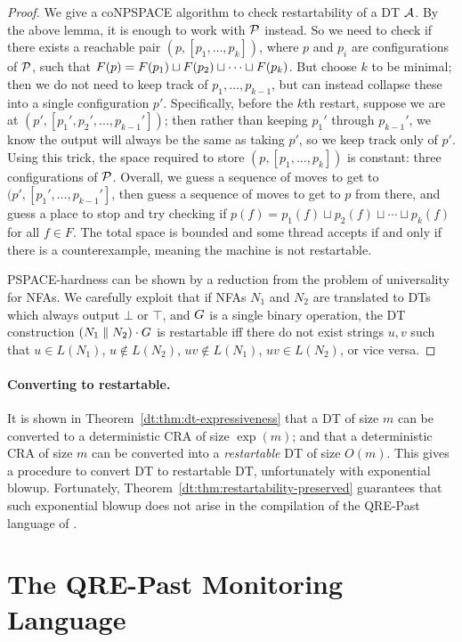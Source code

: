\begin{proof}
We give a coNPSPACE algorithm to check restartability of a DT $\mathcal{A}$. By the above lemma, it is enough to work with $\mathcal{P}$ instead.
So we need to check if there exists
a reachable pair $(p, [p_1,\ldots,p_k])$,
where $p$ and $p_i$ are configurations of $\mathcal{P}$,
such that
$F(p) = F(p_1) \sqcup F(p_2) \sqcup \cdots \sqcup F(p_k)$.
But choose $k$ to be minimal;
then we do not need to keep track of $p_1, \ldots, p_{k-1}$,
but can instead collapse these into a single configuration $p'$.
Specifically, before the $k$th restart,
suppose we are at $(p', [p_1',p_2',\ldots, p_{k-1}'])$;
then rather than keeping $p_1'$ through $p_{k-1}'$,
we know the output will always be the same as taking $p'$,
so we keep track only of $p'$.
Using this trick, the space required to store
$(p, [p_1, \ldots, p_k])$ is constant: three configurations of $\mathcal{P}$.
Overall, we guess a sequence of moves to get
to $(p', [p_1', \ldots, p_{k-1}']$,
then guess a sequence of moves to get to $p$ from there,
and guess a place to stop and try checking if
$p(f) = p_1(f) \sqcup p_2(f) \sqcup \cdots \sqcup p_k(f)$ for all $f \in F$.
The total space is bounded and some thread accepts if and only if there is a counterexample,
meaning the machine is not restartable.

PSPACE-hardness can be shown by a reduction from the problem of universality for NFAs.
We carefully exploit that if
NFAs $N_1$ and $N_2$ are translated to DTs which always output $\bot$ or $\top$,
and $G$ is a single binary operation,
the DT construction $(N_1 \; \| \; N_2) \cdot G$ is restartable iff
there do not exist strings $u, v$ such that
$u \in L(N_1)$, $u \notin L(N_2)$, $uv \notin L(N_1)$, $uv \in L(N_2)$, or vice versa.
\end{proof}

\paragraph*{Converting to restartable.}
It is shown in Theorem~\ref{dt:thm:dt-expressiveness} that a DT of size $m$ can be converted to a deterministic CRA of size $\exp(m)$; and that a deterministic CRA of size $m$ can be converted into a \emph{restartable} DT of size $O(m)$. This gives a procedure to convert DT to restartable DT, unfortunately with exponential blowup. Fortunately, Theorem~\ref{dt:thm:restartability-preserved} guarantees that such exponential blowup does not arise in the compilation of the QRE-Past language of .

\section{The QRE-Past Monitoring Language}
\label{dt:sec:rm}

